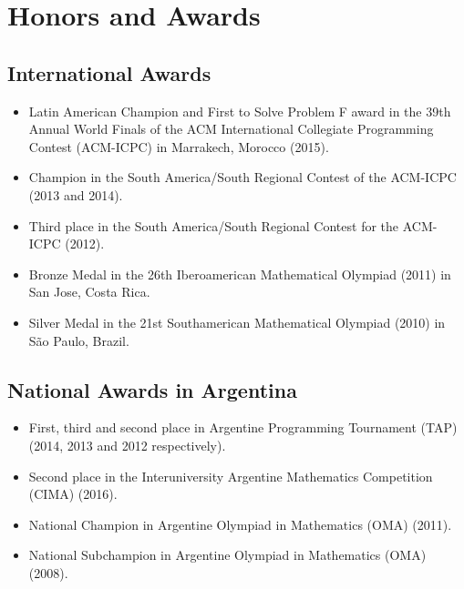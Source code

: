 \documentclass [a4paper, 11pt]{article}
\begin{document}
\section* {Honors and Awards}

\subsection* {International Awards}

\begin{itemize} \itemsep.05cm
	\item[] Latin American Champion and First to Solve Problem F award in the 39th Annual World Finals of the ACM International Collegiate Programming Contest (ACM-ICPC) in Marrakech, Morocco (2015).
	\item[] Champion in the South America/South Regional Contest of the ACM-ICPC (2013 and 2014).
	\item[] Third place in the South America/South Regional Contest for the ACM-ICPC (2012).
	\item[] Bronze Medal in the 26th Iberoamerican Mathematical Olympiad (2011) in San Jose, Costa Rica.
	\item[] Silver Medal in the 21st Southamerican Mathematical Olympiad (2010) in S\~ao Paulo, Brazil. 
\end{itemize}

\subsection* {National Awards in Argentina}

\begin{itemize} \itemsep.05cm
    \item[] First, third and second place in Argentine Programming Tournament (TAP) (2014, 2013 and 2012 respectively).
    \item[] Second place in the Interuniversity Argentine Mathematics Competition (CIMA) (2016).
	\item[] National Champion in Argentine Olympiad in Mathematics (OMA) (2011).
	\item[] National Subchampion in Argentine Olympiad in Mathematics (OMA) (2008).
	
\end{itemize}

\newpage
\end{document}

